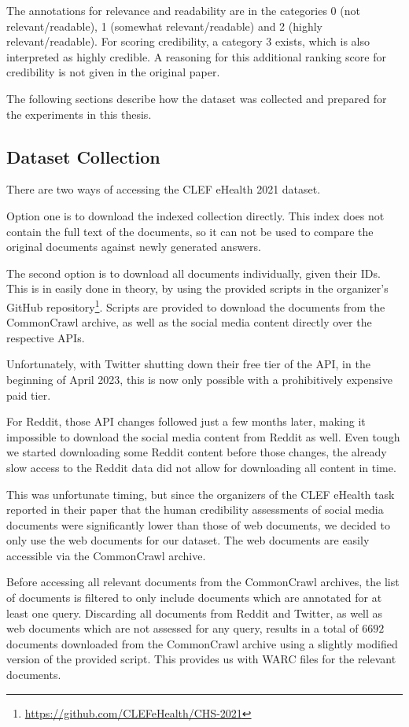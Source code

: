 The annotations for relevance and readability are in the categories 0 (not relevant/readable), 1 (somewhat relevant/readable) and 2 (highly relevant/readable).
For scoring credibility, a category 3 exists, which is also interpreted as highly credible.
A reasoning for this additional ranking score for credibility is not given in the original paper.

The following sections describe how the dataset was collected and prepared for the experiments in this thesis.
\subsection{Dataset Collection}
There are two ways of accessing the CLEF eHealth 2021 dataset.

Option one is to download the indexed collection directly.
This index does not contain the full text of the documents, so it can not be used to compare the original documents against newly generated answers.

The second option is to download all documents individually, given their IDs.
This is in easily done in theory, by using the provided scripts in the organizer's GitHub repository\footnote{\url{https://github.com/CLEFeHealth/CHS-2021}}.
Scripts are provided to download the documents from the CommonCrawl archive, as well as the social media content directly over the respective APIs.

Unfortunately, with Twitter shutting down their free tier of the API, in the beginning of April 2023, this is now only possible with a prohibitively expensive paid tier.

For Reddit, those API changes followed just a few months later, making it impossible to download the social media content from Reddit as well.
Even tough we started downloading some Reddit content before those changes, the already slow access to the Reddit data did not allow for downloading all content in time.

This was unfortunate timing, but since the organizers of the CLEF eHealth task reported in their paper that the human credibility assessments of social media documents were significantly lower than those of web documents, we decided to only use the web documents for our dataset.
The web documents are easily accessible via the CommonCrawl archive.


Before accessing all relevant documents from the CommonCrawl archives, the list of documents is filtered to only include documents which are annotated for at least one query.
Discarding all documents from Reddit and Twitter, as well as web documents which are not assessed for any query, results in a total of $6692$ documents downloaded from the CommonCrawl archive using a slightly modified version of the provided script.
This provides us with WARC files for the relevant documents.

